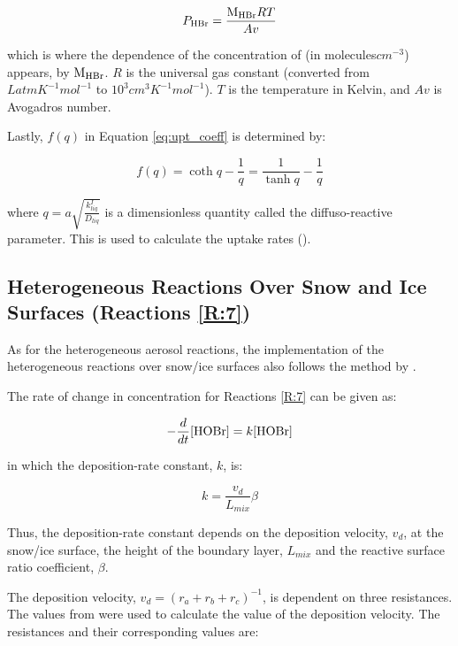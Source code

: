 \begin{equation*}
    P_{\mathrm{HBr}} = \frac{\mathrm{M_{HBr}}RT}{Av}
\end{equation*}

which is where the dependence of the concentration of  (in molecules$cm^{-3}$) appears, by $\mathrm{M_{HBr}}$. $R$ is the universal gas constant (converted from $LatmK^{-1}mol^{-1}$ to $10^3cm^3K^{-1}mol^{-1}$). $T$ is the temperature in Kelvin, and $Av$ is Avogadros number. 

\medskip

Lastly, $f(q)$ in Equation \ref{eq:upt_coeff} is determined by: 

\begin{equation}
    f(q) = \coth{q} -\frac{1}{q} = \frac{1}{\tanh{q}} -\frac{1}{q}
\end{equation}

where $q = a\sqrt{\frac{k_{liq}^I}{D_{liq}}}$ is a dimensionless quantity called the diffuso-reactive parameter. This is used to calculate the uptake rates (\cite{Hanson1994}). 


\subsection{Heterogeneous Reactions Over Snow and Ice Surfaces (Reactions \ref{R:7})}\label{sec:snow_ice_react}


As for the heterogeneous aerosol reactions, the implementation of the heterogeneous reactions over snow/ice surfaces also follows the method by \cite{CAO}. 

\medskip

The rate of change in concentration for Reactions \ref{R:7} can be given as: 

\begin{equation*}
    -\frac{d}{dt}[\mathrm{HOBr}] = k[\mathrm{HOBr}]
\end{equation*}

in which the deposition-rate constant, $k$, is: 

\begin{equation*}
    k = \frac{v_d}{L_{mix}}\beta
\end{equation*}

Thus, the deposition-rate constant depends on the deposition velocity, $v_d$, at the snow/ice surface, the height of the boundary layer, $L_{mix}$ and the reactive surface ratio coefficient, $\beta$. 

\medskip

The deposition velocity, $v_d = (r_a + r_b + r_c)^{-1}$, is dependent on three resistances. The values from \cite{CAO} were used to calculate the value of the deposition velocity. The resistances and their corresponding values are: 


